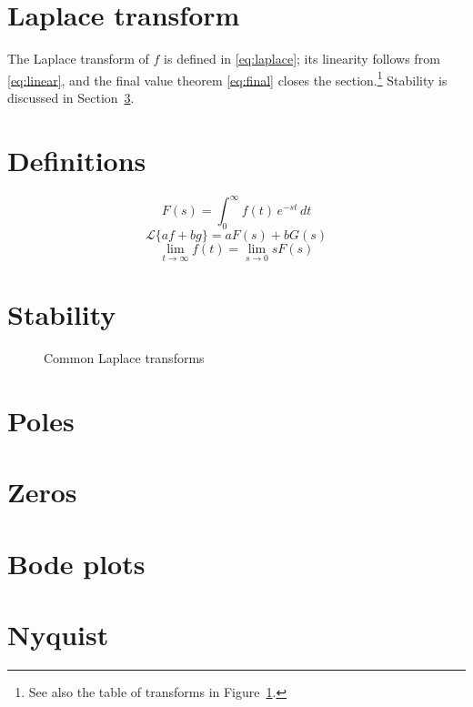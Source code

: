 \documentclass[11pt,a4paper]{article}
\begin{document}
\tableofcontents
\newpage
\section{Laplace transform}
The Laplace transform of $f$ is defined in \eqref{eq:laplace}; its linearity follows from
\eqref{eq:linear}, and the final value theorem \eqref{eq:final} closes the section.\footnote{See also the table of transforms in Figure~\ref{fig:table}.}
Stability is discussed in Section~\ref{sec:stab}.
\lipsum[1-2]
\newpage
\section{Definitions}
\begin{equation}\label{eq:laplace}
  F(s) = \int_0^\infty f(t)\,e^{-st}\,dt
\end{equation}
\lipsum[3]
\begin{equation}\label{eq:linear}
  \mathcal{L}\{a f + b g\} = a F(s) + b G(s)
\end{equation}
\lipsum[4]
\begin{equation}\label{eq:final}
  \lim_{t\to\infty} f(t) = \lim_{s\to 0} s F(s)
\end{equation}
\newpage
\section{Stability}\label{sec:stab}
\lipsum[5]
\begin{figure}[h]
  \centering
  \caption{Common Laplace transforms}\label{fig:table}
\end{figure}
\lipsum[6]

\section{Poles} \lipsum[7]
\section{Zeros} \lipsum[8]
\section{Bode plots} \lipsum[9]
\section{Nyquist} \lipsum[10]
\end{document}
